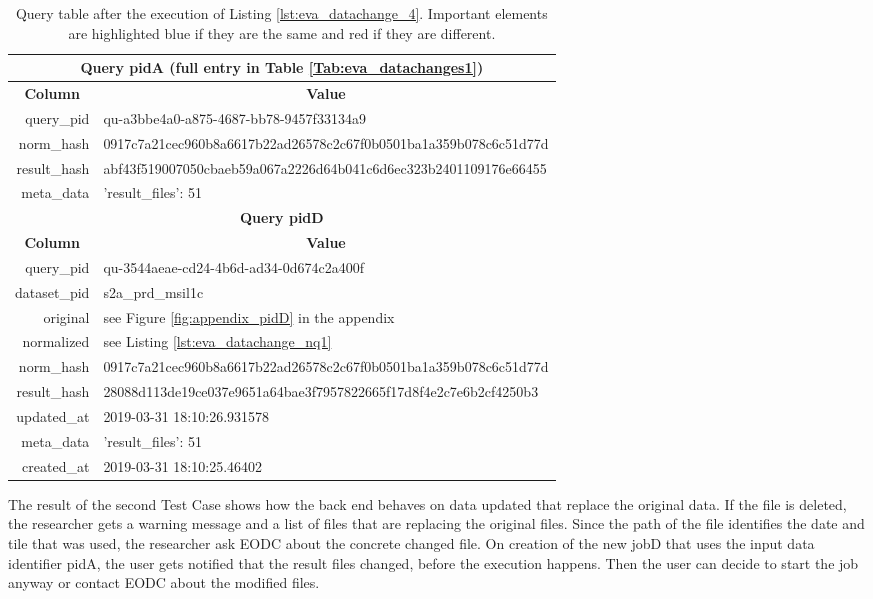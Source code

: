\documentclass[draft,final]{vutinfth} %
\begin{document}
\begin{enumerate}
	\begin{table}[]
	\caption{Query table after the execution of Listing \ref{lst:eva_datachange_4}. Important elements are highlighted blue if they are the same and red if they are different.}
	\centering
	\begin{tabular}{|r|l|}
		\hline \multicolumn{2}{|c|}{\textbf{Query pidA (full entry in Table \ref{Tab:eva_datachanges1})}} \\
		\hline \multicolumn{1}{|c|}{\textbf{Column}}  &  \multicolumn{1}{c|}{\textbf{Value}} \\ \hline
		query\_pid & {\color{red}qu-a3bbe4a0-a875-4687-bb78-9457f33134a9}  \\ 
		norm\_hash & {\color{blue}0917c7a21cec960b8a6617b22ad26578c2c67f0b0501ba1a359b078c6c51d77d}  \\
		result\_hash & {\color{red}abf43f519007050cbaeb59a067a2226d64b041c6d6ec323b2401109176e66455}   \\
		meta\_data & {'result\_files': 51}  \\
		\hline \multicolumn{2}{|c|}{\textbf{Query pidD}} \\
		\hline \multicolumn{1}{|c|}{\textbf{Column}}  &  \multicolumn{1}{c|}{\textbf{Value}} \\ \hline
		query\_pid & { \color{red} qu-3544aeae-cd24-4b6d-ad34-0d674c2a400f}  \\ 
		dataset\_pid & s2a\_prd\_msil1c  \\ 
		original & see Figure \ref{fig:appendix_pidD} in the appendix \\
		normalized & see Listing \ref{lst:eva_datachange_nq1}  \\
		norm\_hash & {\color{blue}0917c7a21cec960b8a6617b22ad26578c2c67f0b0501ba1a359b078c6c51d77d}  \\
		result\_hash & {\color{red}28088d113de19ce037e9651a64bae3f7957822665f17d8f4e2c7e6b2cf4250b3}  \\
		updated\_at & 2019-03-31 18:10:26.931578   \\
		meta\_data & {'result\_files': 51}  \\
		created\_at & 2019-03-31 18:10:25.46402   \\ \hline
	\end{tabular}
	\label{Tab:eva_datachanges5}
\end{table}
\end{enumerate}

The result of the second Test Case shows how the back end behaves on data updated that replace the original data. If the file is deleted, the researcher gets a warning message and a list of files that are replacing the original files. Since the path of the file identifies the date and tile that was used, the researcher ask EODC about the concrete changed file. On creation of the new jobD that uses the input data identifier pidA, the user gets notified that the result files changed, before the execution happens. Then the user can decide to start the job anyway or contact EODC about the modified files.
\end{document}

